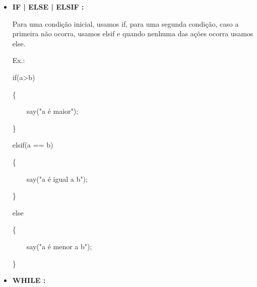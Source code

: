 \documentclass[a4paper]{article}
\begin{document}
{{{{{\begin{itemize}
            Para imprimir, é necessário usar o
            comando 
            \textcolor{NavyBlue}{say} e
            colocar o que se deseja imprimir entre
            parênteses.
            Você pode imprimir uma "String" ou o 
            valor de uma variável.
            A diferença entre SAY e PRINT é que
            SAY pula uma linha no fim e PRINT não.
            
            \textcolor{NavyBlue}{Ex.:}
            \textcolor{NavyBlue}{say(variavel)}
            ;
            
            \textcolor{NavyBlue}{Ex.:}
            \textcolor{NavyBlue}{say("Hello World!")}
            ;
        
            
\newpage %
            
            
        \item \textbf{IF | ELSE | ELSIF : }
            
            Para uma condição inicial, usamos
            \textcolor{NavyBlue}{if},
            para uma segunda condição, caso a 
            primeira não ocorra, usamos
            \textcolor{NavyBlue}{elsif}
            e quando nenhuma das ações ocorra
            usamos 
            \textcolor{NavyBlue}{else}.
            
            \textcolor{NavyBlue}{Ex.:}
            
            \textcolor{NavyBlue}{if(a>b)}
            
            \{
            
            \ \ \ \  say("a é maior");
            
            \}
            
            \textcolor{NavyBlue}{elsif(a == b)}
            
            \{
            
            \ \ \ \ say("a é igual a b");
            
            \}
            
            \textcolor{NavyBlue}{else}
            
            \{
            
            \ \ \ \  say("a é menor a b");
            
            \}
    
        \bigskip    
            
        \item \textbf{WHILE :}
            

\end{itemize}}}}}}
\end{document}
